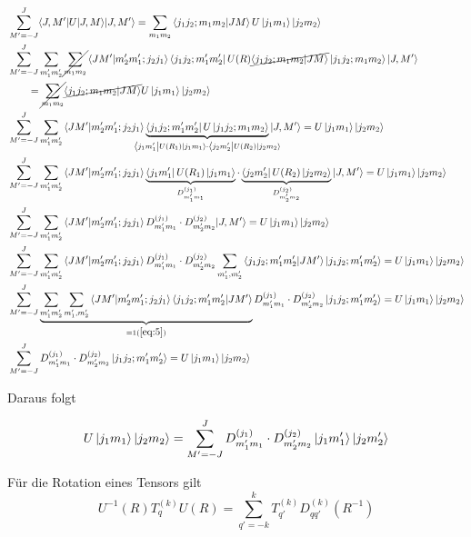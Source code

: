 \begin{align}
  \label{eq:22}
  &\sum_{M'=-J}^J \langle J,M'|  U|J,M\rangle |J,M'\rangle = \sum_{m_1 m_2} \braket{j_1j_2;m_1m_2}{JM}U\ket{j_1m_1}\ket{j_2m_2}\notag \\
&\sum_{M'=-J}^J \sum_{m'_1m'_2}\cancel{\sum_{m_1m_2}}\braket{JM'}{m'_2m'_1;j_2j_1}\bra{j_1j_2;m'_1m'_2}  U(R) \cancel{\braket{j_1j_2;m_1m_2}{JM}}\ket{j_1j_2;m_1m_2}  |J,M'\rangle\notag \\
& \qquad = \cancel{\sum_{m_1 m_2}}\cancel{\braket{j_1j_2;m_1m_2}{JM}}U\ket{j_1m_1}\ket{j_2m_2}\notag \\
&\sum_{M'=-J}^J \sum_{m'_1m'_2}\braket{JM'}{m'_2m'_1;j_2j_1} \underbr{ \bra{j_1j_2;m'_1m'_2}  U \ket{j_1j_2;m_1m_2} }_{  \bra{j_1m'_1}  U(R_1) \ket{j_1m_1} \cdot  \bra{j_2m'_2}  U(R_2) \ket{j_2m_2}  } |J,M'\rangle  = U\ket{j_1m_1}\ket{j_2m_2} \notag\\
&\sum_{M'=-J}^J \sum_{m'_1m'_2}\braket{JM'}{m'_2m'_1;j_2j_1} \underbr{ \bra{j_1m'_1}  U(R_1) \ket{j_1m_1}}_{D^{(j_1)}_{m'_1m_1}} \cdot \underbr{\bra{j_2m'_2}  U(R_2) \ket{j_2m_2} }_{D^{(j_2)}_{m'_2m_2} }  |J,M'\rangle  = U\ket{j_1m_1}\ket{j_2m_2}\notag \\
&\sum_{M'=-J}^J \sum_{m'_1m'_2}\braket{JM'}{m'_2m'_1;j_2j_1} D^{(j_1)}_{m'_1m_1} \cdot D^{(j_2)}_{m'_2m_2}   |J,M'\rangle  = U\ket{j_1m_1}\ket{j_2m_2}\notag \\
&\sum_{M'=-J}^J \sum_{m'_1m'_2}\braket{JM'}{m'_2m'_1;j_2j_1} D^{(j_1)}_{m'_1m_1} \cdot D^{(j_2)}_{m'_2m_2}  \sum_{m'_1,m'_2}\braket{j_1j_2;m'_1m'_2}{JM'}\ket{j_1j_2;m'_1m'_2}  = U\ket{j_1m_1}\ket{j_2m_2}\notag \\
&\sum_{M'=-J}^J \underbr{\sum_{m'_1m'_2} \sum_{m'_1,m'_2} \braket{JM'}{m'_2m'_1;j_2j_1}\braket{j_1j_2;m'_1m'_2}{JM'}}_{=1 (\ref{eq:5})} D^{(j_1)}_{m'_1m_1} \cdot D^{(j_2)}_{m'_2m_2} \ket{j_1j_2;m'_1m'_2}  = U\ket{j_1m_1}\ket{j_2m_2}\notag \\
&\sum_{M'=-J}^J  D^{(j_1)}_{m'_1m_1} \cdot D^{(j_2)}_{m'_2m_2} \ket{j_1j_2;m'_1m'_2}  = U\ket{j_1m_1}\ket{j_2m_2}
\end{align}


Daraus folgt

\begin{equation}
  \label{eq:23}
   U\left| j_1m_1 \right\rangle\left| j_2m_2 \right\rangle = \sum_{M'=-J}^J  D^{(j_1)}_{m'_1m_1} \cdot D^{(j_2)}_{m'_2m_2} \left| j_1m'_1 \right\rangle\left| j_2m'_2 \right\rangle
\end{equation}



Für die Rotation eines Tensors gilt
\begin{equation}
  \label{eq:16}
  U^{-1}(R) T^{(k)}_q U(R) = \sum_{q'=-k}^{k}T^{(k)}_{q'} D^{(k)}_{qq'}(R^{-1}) 
\end{equation}

